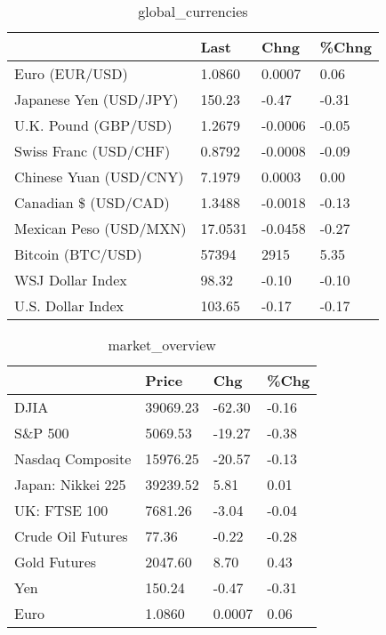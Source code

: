 \documentclass{article}%
\begin{document}
%


\begin{table}[htbp]%
\caption{global\_currencies}%
\centering%
\begin{adjustbox}{width=1\textwidth}%
\begin{tabular}{llll}
\toprule
                       &    Last &    Chng & \%Chng \\
\midrule
        Euro (EUR/USD) &  1.0860 &  0.0007 &  0.06 \\
Japanese Yen (USD/JPY) &  150.23 &   -0.47 & -0.31 \\
  U.K. Pound (GBP/USD) &  1.2679 & -0.0006 & -0.05 \\
 Swiss Franc (USD/CHF) &  0.8792 & -0.0008 & -0.09 \\
Chinese Yuan (USD/CNY) &  7.1979 &  0.0003 &  0.00 \\
  Canadian \$ (USD/CAD) &  1.3488 & -0.0018 & -0.13 \\
Mexican Peso (USD/MXN) & 17.0531 & -0.0458 & -0.27 \\
     Bitcoin (BTC/USD) &   57394 &    2915 &  5.35 \\
      WSJ Dollar Index &   98.32 &   -0.10 & -0.10 \\
     U.S. Dollar Index &  103.65 &   -0.17 & -0.17 \\
\bottomrule
\end{tabular}
%
\end{adjustbox}%
\end{table}

%


\begin{table}[htbp]%
\caption{market\_overview}%
\centering%
\begin{adjustbox}{width=1\textwidth}%
\begin{tabular}{llll}
\toprule
                  &    Price &    Chg &  \%Chg \\
\midrule
             DJIA & 39069.23 & -62.30 & -0.16 \\
          S\&P 500 &  5069.53 & -19.27 & -0.38 \\
 Nasdaq Composite & 15976.25 & -20.57 & -0.13 \\
Japan: Nikkei 225 & 39239.52 &   5.81 &  0.01 \\
     UK: FTSE 100 &  7681.26 &  -3.04 & -0.04 \\
Crude Oil Futures &    77.36 &  -0.22 & -0.28 \\
     Gold Futures &  2047.60 &   8.70 &  0.43 \\
              Yen &   150.24 &  -0.47 & -0.31 \\
             Euro &   1.0860 & 0.0007 &  0.06 \\
\bottomrule
\end{tabular}
%
\end{adjustbox}%
\end{table}

%
\end{document}
